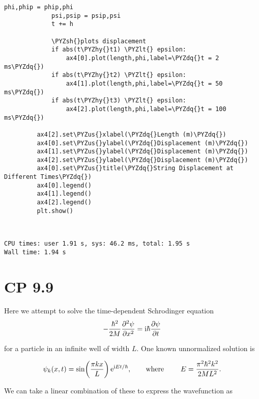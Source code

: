 \documentclass[11pt]{article}
\def\PYZus{\char`\_}
\def\PYZlt{\char`\<}
\def\PYZsh{\char`\#}
\def\PYZhy{\char`\-}
\def\PYZdq{\char`\"}
\begin{document}
\begin{Verbatim}[commandchars=\\\{\}]
             phi,phip = phip,phi
             psi,psip = psip,psi
             t += h
         
             \PYZsh{}plots displacement
             if abs(t\PYZhy{}t1) \PYZlt{} epsilon:
                 ax4[0].plot(length,phi,label=\PYZdq{}t = 2 ms\PYZdq{})
             if abs(t\PYZhy{}t2) \PYZlt{} epsilon:
                 ax4[1].plot(length,phi,label=\PYZdq{}t = 50 ms\PYZdq{})
             if abs(t\PYZhy{}t3) \PYZlt{} epsilon:
                 ax4[2].plot(length,phi,label=\PYZdq{}t = 100 ms\PYZdq{})
         
         ax4[2].set\PYZus{}xlabel(\PYZdq{}Length (m)\PYZdq{})
         ax4[0].set\PYZus{}ylabel(\PYZdq{}Displacement (m)\PYZdq{})
         ax4[1].set\PYZus{}ylabel(\PYZdq{}Displacement (m)\PYZdq{})
         ax4[2].set\PYZus{}ylabel(\PYZdq{}Displacement (m)\PYZdq{})
         ax4[0].set\PYZus{}title(\PYZdq{}String Displacement at Different Times\PYZdq{})
         ax4[0].legend()
         ax4[1].legend()
         ax4[2].legend()
         plt.show()
\end{Verbatim}

    \begin{center}
    \end{center}
    { \hspace*{\fill} \\}
    
    \begin{Verbatim}[commandchars=\\\{\}]
CPU times: user 1.91 s, sys: 46.2 ms, total: 1.95 s
Wall time: 1.94 s

    \end{Verbatim}

    \section{CP 9.9}\label{cp-9.9}

Here we attempt to solve the time-dependent Schrodinger equation
\[-{\hbar^2\over2M} {\partial^2\psi\over\partial x^2} = \text{i}\hbar {\partial\psi\over\partial t}\]

for a particle in an infinite well of width \(L.\) One known
unnormalized solution is

\[\psi_k(x,t) = \sin \biggl( {\pi k x\over L} \biggr)\,\text{e}^{\text{i} Et/\hbar}, \qquad \text{where } \qquad E = {\pi^2\hbar^2k^2\over2ML^2}.\]

We can take a linear combination of these to express the wavefunction as
\end{document}
